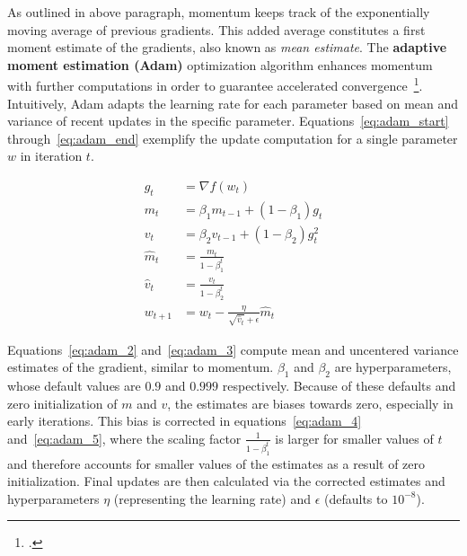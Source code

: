 As outlined in above paragraph, momentum keeps track of the exponentially moving
average of previous gradients.
This added average constitutes a first moment estimate of the gradients, also 
known as \textit{mean estimate}.
The \textbf{adaptive moment estimation (Adam)} optimization algorithm enhances
momentum with further computations in order to guarantee accelerated
convergence~\footcite{Kingma2014a}.
Intuitively, Adam adapts the learning rate for each parameter based on mean and
variance of recent updates in the specific parameter.
Equations~\ref{eq:adam_start} through~\ref{eq:adam_end} exemplify the update
computation for a single parameter $w$ in iteration $t$.

\begin{align}
  g_t &= \nabla f(w_t) \label{eq:adam_start} \\
  m_t &= \beta_1 m_{t-1} + (1-\beta_1) g_t \label{eq:adam_2} \\
  v_t &= \beta_2 v_{t-1} + (1-\beta_2) g_t^2 \label{eq:adam_3} \\
  \widehat{m}_t &= \frac{m_t}{1-\beta_1^t} \label{eq:adam_4} \\
  \widehat{v}_t &= \frac{v_t}{1-\beta_2^t} \label{eq:adam_5} \\
  w_{t+1} &= w_t - \frac{\eta}{\sqrt{\widehat{v}_t} + \epsilon} \widehat{m}_t \label{eq:adam_end}
\end{align}

Equations~\ref{eq:adam_2} and~\ref{eq:adam_3} compute mean and
uncentered variance estimates of the gradient, similar to momentum.
$\beta_1$ and $\beta_2$ are hyperparameters, whose default values are $0.9$ and
$0.999$ respectively.
Because of these defaults and zero initialization of $m$ and $v$, the estimates
are biases towards zero, especially in early iterations.
This bias is corrected in equations~\ref{eq:adam_4} and~\ref{eq:adam_5}, where
the scaling factor $\frac{1}{1-\beta_1^t}$ is larger for smaller values of $t$
and therefore accounts for smaller values of the estimates as a result of 
zero initialization.
Final updates are then calculated via the corrected estimates and hyperparameters
$\eta$ (representing the learning rate) and $\epsilon$ (defaults to $10^{-8}$).

